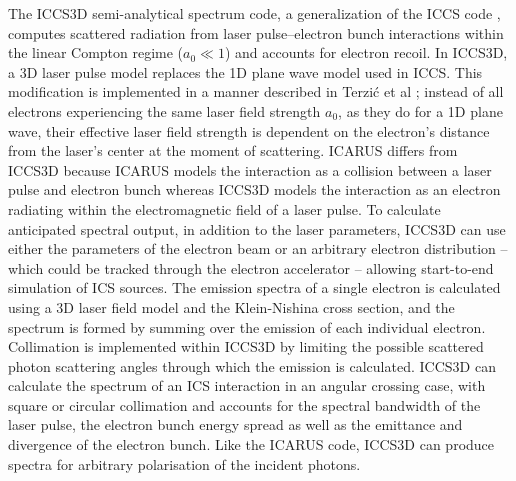 \documentclass[../main.tex]{subfiles}
\begin{document}
The \textsc{ICCS3D} semi-analytical spectrum code, a generalization of the \textsc{ICCS} code \cite{krafft2016laser,ranjan2018simulation}, computes scattered radiation from laser pulse--electron bunch interactions within the linear Compton regime ($a_{0}\ll 1$) and accounts for electron recoil. In \textsc{ICCS3D}, a 3D laser pulse model replaces the 1D plane wave model used in \textsc{ICCS}. This modification is implemented in a manner described in Terzi\'c et al \cite{terzic2019improving}; instead of all electrons experiencing the same laser field strength $a_{0}$, as they do for a 1D plane wave, their effective laser field strength is dependent on the electron's distance from the laser's center at the moment of scattering. \textsc{ICARUS} differs from \textsc{ICCS3D} because \textsc{ICARUS} models the interaction as a collision between a laser pulse and electron bunch whereas \textsc{ICCS3D} models the interaction as an electron radiating within the electromagnetic field of a laser pulse. To calculate anticipated spectral output, in addition to the laser parameters, \textsc{ICCS3D} can use either the parameters of the electron beam or an arbitrary electron distribution -- which could be tracked through the electron accelerator -- allowing start-to-end simulation of ICS sources. The emission spectra of a single electron is calculated using a 3D laser field model and the Klein-Nishina cross section, and the spectrum is formed by summing over the emission of each individual electron. Collimation is implemented within \textsc{ICCS3D} by limiting the possible scattered photon scattering angles through which the emission is calculated. \textsc{ICCS3D} can calculate the spectrum of an ICS interaction in an angular crossing case, with square or circular collimation and accounts for the spectral bandwidth of the laser pulse, the electron bunch energy spread as well as the emittance and divergence of the electron bunch. Like the \textsc{ICARUS} code, \textsc{ICCS3D} can produce spectra for arbitrary polarisation of the incident photons.   
\end{document}
